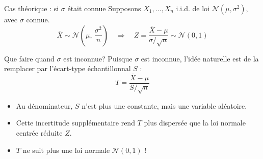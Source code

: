 \documentclass{BeamerTemplate}
\begin{document}
\begin{frame}[t]{Cas théorique : si $\sigma$ était connue}
  Supposons $X_1, \ldots, X_n$ i.i.d. de loi $\mathcal{N}(\mu, \sigma^2)$, avec $\sigma$ \alert{connue}.
  $$\overline{X} \sim \mathcal{N}\left(\mu,\, \frac{\sigma^2}{n}\right) \quad \Longrightarrow \quad Z = \frac{\overline{X} - \mu}{\sigma/\sqrt{n}} \sim \mathcal{N}(0, 1)$$

  \vspace{-2mm}

  \vspace{-4mm}

  \vspace{-2mm}
\end{frame}

\begin{frame}[t]{Que faire quand $\sigma$ est inconnue?}
  Puisque $\sigma$ est inconnue, l'idée naturelle est de la remplacer par l'écart-type échantillonnal $S$ :
  $$T = \frac{\overline{X} - \mu}{S / \sqrt{n}}$$

  \vspace{-2mm}
  \begin{itemize}\itemsep 2mm
    \item<2-> Au dénominateur, $S$ n'est plus une constante, mais une \alert{variable aléatoire}.
    \item<3-> Cette incertitude supplémentaire rend $T$ \alert{plus dispersée} que la loi normale centrée réduite $Z$.
    \item<4-> $T$ ne suit plus une loi normale $\mathcal{N}(0,1)$ !
  \end{itemize}

\end{frame}
\end{document}
